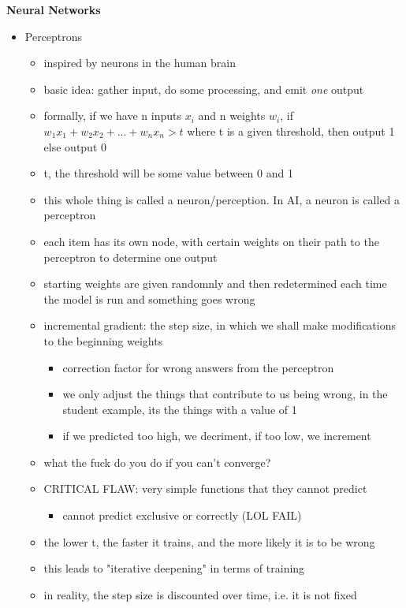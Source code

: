 \documentclass[12pt]{article}
\begin{document}
	\newpage \vfill
	\textbf{\centering Neural Networks}
	\begin{itemize}
		\item Perceptrons
		\begin{itemize}
			\item inspired by neurons in the human brain 
			\item basic idea: gather input, do some processing, and emit \emph{one} output
			\item formally, if we have n inputs $x_i$ and n weights $w_i$, 
			if $w_1x_1 + w_2x_2 + ... + w_nx_n > t$ where t is a given threshold, then output 1
			else output 0 
			\item t, the threshold will be some value between 0 and 1
			\item this whole thing is called a neuron/perception. In AI, a neuron is called a perceptron
			\item each item has its own node, with certain weights on their path to the perceptron to determine one output 
			\item starting weights are given randomnly and then redetermined each time the model is run and something goes wrong
			\item incremental gradient: the step size, in which we shall make modifications to the beginning weights 
			\begin{itemize}
				\item correction factor for wrong answers from the perceptron 
				\item we only adjust the things that contribute to us being wrong, in the student example, its the things with a value of 1
				\item if we predicted too high, we decriment, if too low, we increment
			\end{itemize}
			\item what the fuck do you do if you can't converge? 
			\item CRITICAL FLAW: very simple functions that they cannot predict 
			\begin{itemize}
				\item cannot predict exclusive or correctly (LOL FAIL)
			\end{itemize}
			\item the lower t, the faster it trains, and the more likely it is to be wrong 
			\item this leads to "iterative deepening" in terms of training
			\item in reality, the step size is discounted over time, i.e. it is not fixed 

\end{itemize}
\end{itemize}
\end{document}
